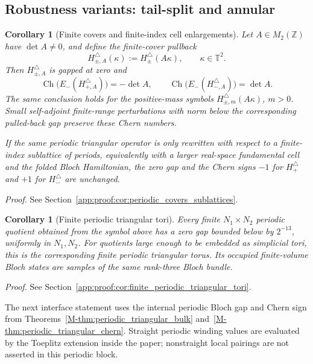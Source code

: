 \documentclass[11pt]{article}
\numberwithin{equation}{section}
\newtheorem{corollary}[theorem]{Corollary}
\theoremstyle{definition}
\theoremstyle{remark}
\newcommand{\proofref}[1]{%
  \par\noindent\emph{Proof.} See Section~\ref{#1}.\par\medskip
}
\newcommand{\proofappendixref}[1]{\proofref{#1}}
\newcommand{\Ch}{\operatorname{Ch}}
\begin{document}
\subsection{Robustness variants: tail-split and annular}\label{app:robustness_tail_annular}
\begin{corollary}[Finite covers and finite-index cell enlargements]\label{cor:periodic_covers_sublattices}
Let \(A\in M_2(\mathbb Z)\) have \(\det A\ne0\), and define the finite-cover pullback
\[
H_{\pm,A}^\triangle(\kappa):=H_\pm^\triangle(A\kappa),
\qquad \kappa\in\mathbb T^2 .
\]
Then \(H_{\pm,A}^\triangle\) is gapped at zero and
\[
\Ch\bigl(E_-(H_{+,A}^\triangle)\bigr)=-\det A,
\qquad
\Ch\bigl(E_-(H_{-,A}^\triangle)\bigr)=\det A .
\]
The same conclusion holds for the positive-mass symbols \(H_{\pm,m}^\triangle(A\kappa)\), \(m>0\).
Small self-adjoint finite-range perturbations with norm below the corresponding pulled-back gap
preserve these Chern numbers.

If the same periodic triangular operator is only rewritten with respect to a finite-index
sublattice of periods, equivalently with a larger real-space fundamental cell and the folded Bloch
Hamiltonian, the zero gap and the Chern signs \(-1\) for \(H_+^\triangle\) and \(+1\) for
\(H_-^\triangle\) are unchanged.
\end{corollary}
\proofappendixref{app:proof:cor:periodic_covers_sublattices}



\begin{corollary}[Finite periodic triangular tori]\label{cor:finite_periodic_triangular_tori}
Every finite \(N_1\times N_2\) periodic quotient obtained from the symbol above has a zero gap
bounded below by \(2^{-13}\), uniformly in \(N_1,N_2\). For quotients large enough to be embedded
as simplicial tori, this is the corresponding finite periodic triangular torus. Its occupied
finite-volume Bloch states are samples of the same rank-three Bloch bundle.
\end{corollary}
\proofappendixref{app:proof:cor:finite_periodic_triangular_tori}


The next interface statement uses the internal periodic Bloch gap and Chern sign from
Theorems~\ref{M-thm:periodic_triangular_bulk} and~\ref{M-thm:periodic_triangular_chern}. Straight
periodic winding values are evaluated by the Toeplitz extension inside the paper; nonstraight local
pairings are not asserted in this periodic block.
\end{document}
